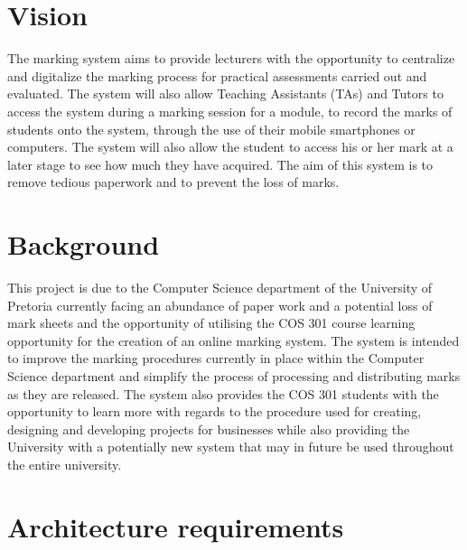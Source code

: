 \documentclass[12pt, a4paper]{scrartcl}
\begin{document}
		\section{Vision}
			The marking system aims to provide lecturers with the opportunity to centralize and digitalize the marking process for practical assessments carried out and evaluated. The system will also allow Teaching Assistants (TAs) and Tutors to access the system during a marking session for a module, to record the marks of students onto the system, through the use of their mobile smartphones or computers. The system will also allow the student to access his or her mark at a later stage to see how much they have acquired. The aim of this system is to remove tedious paperwork and to prevent the loss of marks.
		\section{Background}
			This project is due to the Computer Science department of the University of Pretoria currently facing an abundance of paper work and a potential loss of mark sheets and the opportunity of utilising the COS 301 course learning opportunity for the creation of an online marking system. The system is intended to improve the marking procedures currently in place within the Computer Science department and simplify the process of processing and distributing marks as they are released. The system also provides the COS 301 students with the opportunity to learn more with regards to the procedure used for creating, designing and developing projects for businesses while also providing the University with a potentially new system that may in future be used throughout the entire university.
		\section{Architecture requirements}
\end{document}
